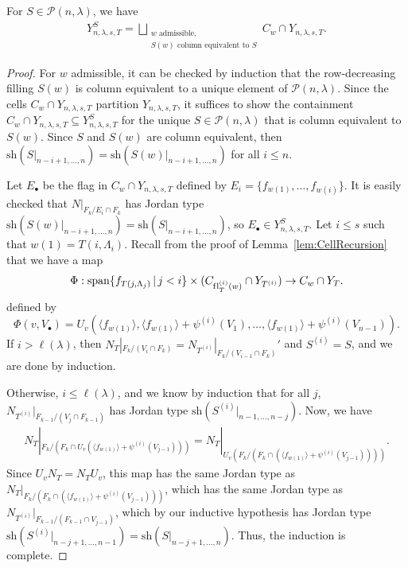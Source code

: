 \documentclass[12pt]{amsart}
\newcommand{\st}{\,|\,}
\newcommand{\vspan}{\mathrm{span}}
\newcommand{\la}{\lambda}
\newcommand{\fl}{\mathrm{f\hspace{0.25pt}l}}
\newcommand{\sh}{\mathrm{sh}}
\begin{document}
\begin{lemma}\label{lem:IrredSubspaceUnion}
  For $S\in \mathcal{P}(n,\la)$, we have
  \begin{align}
    Y_{n,\la,s,T}^S = \bigsqcup_{\substack{w\text{ admissible},\\ S(w) \text{ column equivalent to }S}} C_w \cap Y_{n,\la,s,T}.
  \end{align}

  \begin{proof}
    For $w$ admissible, it can be checked by induction that the row-decreasing filling $S(w)$ is column equivalent to a unique element of $\mathcal{P}(n,\la)$. Since the cells $C_w\cap Y_{n,\la,s,T}$ partition $Y_{n,\la,s,T}$, it suffices to show the containment $C_w\cap Y_{n,\la,s,T}\subseteq Y_{n,\la,s,T}^S$ for the unique $S\in\mathcal{P}(n,\la)$ that is column equivalent to $S(w)$. Since $S$ and $S(w)$ are column equivalent, then $\sh(S|_{n-i+1,\dots, n}) = \sh(S(w)|_{n-i+1,\dots, n})$ for all $i\leq n$.

    Let $E_\bullet$ be the flag in $C_w\cap Y_{n,\la,s,T}$ defined by $E_i = \{f_{w(1)},\dots, f_{w(i)}\}$. It is easily checked that $N|_{F_k/E_i\cap F_k}$ has Jordan type $\sh(S(w)|_{n-i+1,\dots, n}) = \sh(S|_{n-i+1,\dots, n})$, so $E_\bullet\in Y_{n,\la,s,T}^S$. Let $i\leq s$ such that $w(1) = T(i,\Lambda_i)$. Recall from the proof of Lemma~\ref{lem:CellRecursion} that we have a map
    \[
      \Phi : \vspan\{f_{T(j,\Lambda_j)}\st j<i\}\times (C_{\fl_T^{(i)}(w)}\cap Y_{T^{(i)}}) \to C_w \cap Y_T.
      \]
      defined by
      \[
        \Phi(v,V_\bullet) = U_v(\langle f_{w(1)}\rangle, \langle f_{w(1)}\rangle + \psi^{(i)} (V_1),\dots, \langle f_{w(1)}\rangle + \psi^{(i)}(V_{n-1})).
      \]
      If $i>\ell(\la)$, then $N_T|_{F_k/(V_i\cap F_k)} = N_{T^{(i)}}|_{F_k/(V_{i-1}\cap F_k)}'$ and $S^{(i)} = S$, and we are done by induction.

      Otherwise, $i\leq\ell(\la)$, and we know by induction that for all $j$, $N_{T^{(i)}}|_{F_{k-1}/(V_j\cap F_{k-1})}$ has Jordan type $\sh(S^{(i)}|_{n-1,\dots, n-j})$. Now, we have
      \begin{align}
        N_T|_{F_k/(F_k\cap U_v(\langle f_{w(1)}\rangle + \psi^{(i)}(V_{j-1})))} = N_T |_{U_v(F_k/(F_k\cap (\langle f_{w(1)}\rangle + \psi^{(i)}(V_{j-1}))))}.
      \end{align}
      Since $U_v N_T = N_T U_v$, this map has the same Jordan type as $N_T|_{F_k/(F_k\cap (\langle f_{w(1)}\rangle + \psi^{(i)}(V_{j-1})))}$, which has the same Jordan type as $N_{T^{(i)}}|_{F_{k-1}/(F_{k-1}\cap V_{j-1})}$, which by our inductive hypothesis has Jordan type $\sh(S^{(i)}|_{n-j+1,\dots, n-1}) = \sh(S|_{n-j+1,\dots, n})$. Thus, the induction is complete.
    \end{proof}


\end{lemma}
\end{document}
